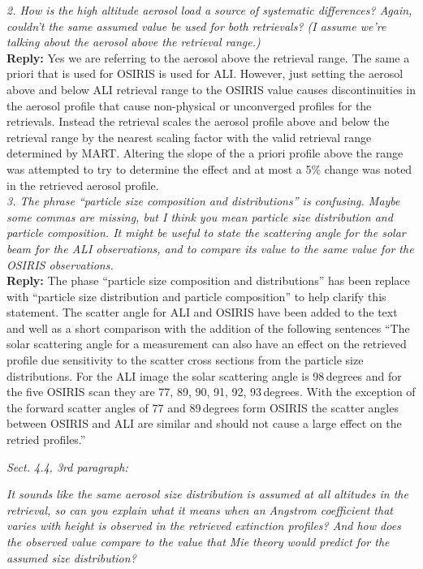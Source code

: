 \documentclass[12pt, notitlepage]{article}
\begin{document}
\textit{2. How is the high altitude aerosol load a source of systematic differences? Again,
couldn't the same assumed value be used for both retrievals? (I assume we're talking
about the aerosol above the retrieval range.)}\\

\textbf{Reply:} Yes we are referring to the aerosol above the retrieval range. The same a priori that is used for OSIRIS is used for ALI. However, just setting the aerosol above and below ALI retrieval range to the OSIRIS value causes discontinuities in the aerosol profile that cause non-physical or unconverged profiles for the retrievals. Instead the retrieval scales the aerosol profile above and below the retrieval range by the nearest scaling factor with the valid retrieval range determined by MART. Altering the slope of the a priori profile above the range was attempted to try to determine the effect and at most a 5\% change was noted in the retrieved aerosol profile.\\

\textit{3. The phrase ``particle size composition and distributions'' is confusing. Maybe some
commas are missing, but I think you mean particle size distribution and particle composition.
It might be useful to state the scattering angle for the solar beam for the ALI observations,
and to compare its value to the same value for the OSIRIS observations.}\\

\textbf{Reply:} The phase ``particle size composition and distributions'' has been replace with ``particle size distribution and particle composition'' to help clarify this statement. The scatter angle for ALI and OSIRIS have been added to the text and well as a short comparison with the addition of the following sentences ``The solar scattering angle for a measurement can also have an effect on the retrieved profile due sensitivity to the scatter cross sections from the particle size distributions. For the ALI image the solar scattering angle is 98\,degrees and for the five OSIRIS scan they are 77, 89, 90, 91, 92, 93\,degrees. With the exception of the forward scatter angles of 77 and 89\,degrees form OSIRIS the scatter angles between OSIRIS and ALI are similar and should not cause a large effect on the retried profiles.''\\

\hrulefill

\textit{Sect. 4.4, 3rd paragraph:}

\textit{It sounds like the same aerosol size distribution is assumed at all altitudes in the retrieval,
so can you explain what it means when an Angstrom coefficient that varies with
height is observed in the retrieved extinction profiles? And how does the observed
value compare to the value that Mie theory would predict for the assumed size distribution?}\\
\end{document}
